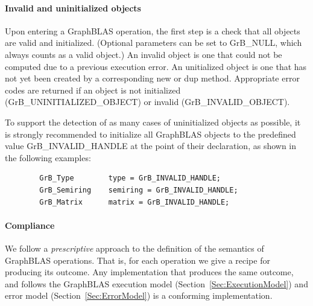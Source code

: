 \paragraph{Invalid and uninitialized objects}

Upon entering a GraphBLAS operation, the first step is a check that all
objects are valid and initialized. (Optional parameters can be set to {\sf
GrB\_NULL}, which always counts as a valid object.)  An invalid object is
one that could not be computed due to a previous execution error. An
unitialized object is one that has not yet been created by a corresponding
{\sf new} or {\sf dup} method.  Appropriate error codes are returned if
an object is not initialized ({\sf GrB\_UNINITIALIZED\_OBJECT}) or invalid
({\sf GrB\_INVALID\_OBJECT}).

To support the detection of as many cases of uninitialized objects as possible,
it is strongly recommended to initialize all GraphBLAS objects to
the predefined value {\sf GrB\_INVALID\_HANDLE} at the point of their declaration,
as shown in the following examples:

\begin{verbatim}
        GrB_Type        type = GrB_INVALID_HANDLE;
        GrB_Semiring    semiring = GrB_INVALID_HANDLE;
        GrB_Matrix      matrix = GrB_INVALID_HANDLE;
\end{verbatim}

\paragraph{Compliance}

We follow a \emph{prescriptive} approach to the definition of the semantics
of GraphBLAS operations. That is, for each operation we give a recipe for
producing its outcome.
Any implementation that produces the same outcome,
and follows the GraphBLAS execution model (Section~\ref{Sec:ExecutionModel}) and
error model (Section~\ref{Sec:ErrorModel}) is a conforming implementation.
